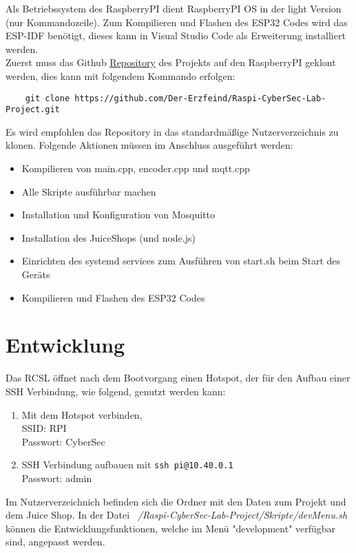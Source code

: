 \documentclass[a4paper,12pt]{article}
\begin{document}
Als Betriebssystem des RaspberryPI dient RaspberryPI OS in der light Version (nur Kommandozeile).
Zum Kompilieren und Flashen des ESP32 Codes wird das ESP-IDF benötigt, dieses kann in Visual Studio Code als Erweiterung installiert werden.\\

 Zuerst muss das Github \href{https://github.com/Der-Erzfeind/Raspi-CyberSec-Lab-Project.git}{Repository} des Projekts auf den RaspberryPI geklont werden, dies kann mit folgendem Kommando erfolgen:
 \begin{verbatim}
    git clone https://github.com/Der-Erzfeind/Raspi-CyberSec-Lab-Project.git
 \end{verbatim}
Es wird empfohlen das Repository in das standardmäßige Nutzerverzeichnis zu klonen.
Folgende Aktionen müssen im Anschluss ausgeführt werden:

\begin{itemize}
    \item Kompilieren von main.cpp, encoder.cpp und mqtt.cpp
    \item Alle Skripte ausführbar machen
    \item Installation und Konfiguration von Mosquitto
    \item Installation des JuiceShops (und node.js)
    \item Einrichten des systemd services zum Ausführen von start.sh beim Start des Geräts
    \item Kompilieren und Flashen des ESP32 Codes
\end{itemize}

\section{Entwicklung}
Das RCSL öffnet nach dem Bootvorgang einen Hotspot, der für den Aufbau einer SSH Verbindung, wie folgend, genutzt werden kann:
\begin{enumerate}
    \item Mit dem Hotspot verbinden, \\SSID: RPI \\Passwort: CyberSec
    \item SSH Verbindung aufbauen mit \lstinline[style=inline]|ssh pi@10.40.0.1| \\Passwort: admin
\end{enumerate}
Im Nutzerverzeichnich befinden sich die Ordner mit den Daten zum Projekt und dem Juice Shop.
In der Datei \textit{~/Raspi-CyberSec-Lab-Project/Skripte/devMenu.sh} können die Entwicklungsfunktionen, welche im Menü "development" verfügbar sind, angepasst werden.
\end{document}
